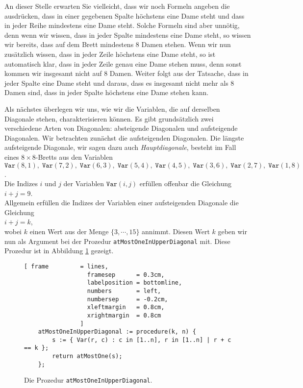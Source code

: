 An dieser Stelle erwarten Sie vielleicht, dass wir noch Formeln angeben die
ausdr\"{u}cken, dass in einer gegebenen Spalte h\"{o}chstens eine Dame steht und dass in jeder
Reihe mindestens eine Dame steht.
Solche Formeln sind aber unn\"{o}tig, denn wenn wir wissen, dass in jeder Spalte mindestens
eine Dame steht, so wissen wir bereits, dass auf dem Brett mindestens 8 Damen stehen.
Wenn wir nun zus\"{a}tzlich wissen, dass in jeder Zeile h\"{o}chstens eine Dame steht, so ist
automatisch klar, dass in jeder Zeile genau eine Dame stehen muss, denn sonst kommen wir insgesamt
nicht auf 8 Damen.  Weiter folgt aus der Tatsache, dass in jeder Spalte eine Dame steht und daraus,
dass es insgesamt nicht mehr als 8 Damen sind, dass in jeder Spalte h\"{o}chstens eine Dame stehen kann.

Als n\"{a}chstes \"{u}berlegen wir uns, wie wir die Variablen, die auf derselben Diagonale
stehen, charakterisieren k\"{o}nnen.  Es gibt grunds\"{a}tzlich zwei verschiedene Arten von
Diagonalen: absteigende Diagonalen und aufsteigende Diagonalen.  Wir betrachten zun\"{a}chst
die aufsteigenden Diagonalen.  Die l\"{a}ngste aufsteigende Diagonale, wir sagen dazu auch
\emph{\color{blue}Hauptdiagonale}, besteht im Fall eines $8 \times 8$-Bretts aus den
Variablen \\[0.2cm]
\hspace*{1.3cm} 
$\texttt{Var}(8,1),\; \texttt{Var}(7,2),\; \texttt{Var}(6,3),\; \texttt{Var}(5,4),\; \texttt{Var}(4,5),\; \texttt{Var}(3,6),\; 
 \texttt{Var}(2,7),\; \texttt{Var}(1,8)$. 
\\[0.2cm]
Die Indizes $i$ und $j$ der Variablen $\texttt{Var}(i,j)$ erf\"{u}llen offenbar
die Gleichung \\[0.2cm]
\hspace*{1.3cm} $i + j = 9$. \\[0.2cm]
Allgemein erf\"{u}llen die Indizes der Variablen einer aufsteigenden Diagonale die Gleichung \\[0.2cm]
\hspace*{1.3cm} $i + j = k$, \\[0.2cm]
wobei $k$ einen Wert aus der Menge $\{3, \cdots, 15 \}$ annimmt.  Diesen Wert $k$ geben
wir nun als Argument bei der Prozedur \texttt{atMostOneInUpperDiagonal} mit.  Diese
Prozedur ist in Abbildung \ref{fig:atMostOneInUpperDiagonal} gezeigt.

\begin{figure}[!ht]
  \centering
\begin{Verbatim}[ frame         = lines, 
                  framesep      = 0.3cm, 
                  labelposition = bottomline,
                  numbers       = left,
                  numbersep     = -0.2cm,
                  xleftmargin   = 0.8cm,
                  xrightmargin  = 0.8cm
                ]
    atMostOneInUpperDiagonal := procedure(k, n) {
        s := { Var(r, c) : c in [1..n], r in [1..n] | r + c == k };
        return atMostOne(s);
    };
\end{Verbatim}
\vspace*{-0.3cm}
  \caption{Die Prozedur \texttt{atMostOneInUpperDiagonal}.}
  \label{fig:atMostOneInUpperDiagonal}
\end{figure}

